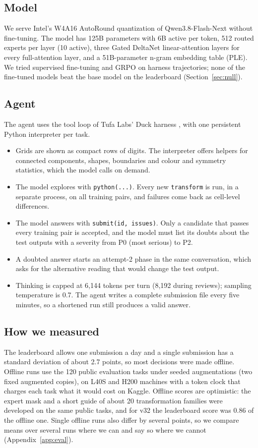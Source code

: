 \documentclass[11pt]{article}
\begin{document}
\subsection{Model}
We serve Intel's W4A16 AutoRound quantization \cite{autoround} of Qwen3.8-Flash-Next without fine-tuning. The model has 125B parameters with 6B active per token, 512 routed experts per layer (10 active), three Gated DeltaNet linear-attention layers \cite{gateddeltanet} for every full-attention layer, and a 51B-parameter n-gram embedding table (PLE). We tried supervised fine-tuning and GRPO on harness trajectories; none of the fine-tuned models beat the base model on the leaderboard (Section~\ref{sec:null}).

\subsection{Agent}
The agent uses the tool loop of Tufa Labs' Duck harness \cite{duck}, with one persistent Python interpreter per task.
\begin{itemize}
\item Grids are shown as compact rows of digits. The interpreter offers helpers for connected components, shapes, boundaries and colour and symmetry statistics, which the model calls on demand.
\item The model explores with \texttt{python(...)}. Every new \texttt{transform} is run, in a separate process, on all training pairs, and failures come back as cell-level differences.
\item The model answers with \texttt{submit(id, issues)}. Only a candidate that passes every training pair is accepted, and the model must list its doubts about the test outputs with a severity from P0 (most serious) to P2.
\item A doubted answer starts an attempt-2 phase in the same conversation, which asks for the alternative reading that would change the test output.
\item Thinking is capped at 6,144 tokens per turn (8,192 during reviews); sampling temperature is 0.7. The agent writes a complete submission file every five minutes, so a shortened run still produces a valid answer.
\end{itemize}

\subsection{How we measured}
The leaderboard allows one submission a day and a single submission has a standard deviation of about 2.7 points, so most decisions were made offline. Offline runs use the 120 public evaluation tasks under seeded augmentations (two fixed augmented copies), on L40S and H200 machines with a token clock that charges each task what it would cost on Kaggle. Offline scores are optimistic: the expert mask and a short guide of about 20 transformation families were developed on the same public tasks, and for v32 the leaderboard score was 0.86 of the offline one. Single offline runs also differ by several points, so we compare means over several runs where we can and say so where we cannot (Appendix~\ref{app:eval}).
\end{document}
